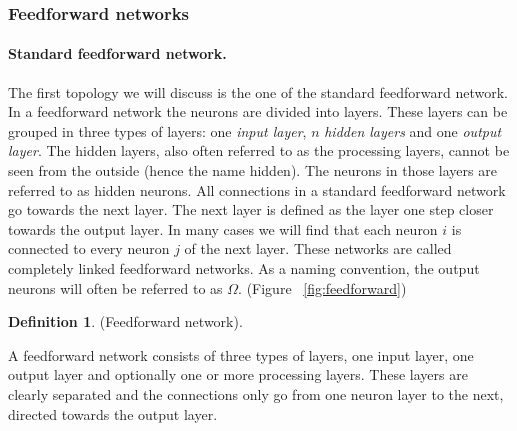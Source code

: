 \documentclass[pdftex,a4paper,12pt,twoside]{report}
\theoremstyle{plain} \newtheorem{theorem}{Theorem} \newtheorem{proposition}{Proposition} \newtheorem{lemma}{Lemma} \newtheorem*{corollary}{Corollary}
\theoremstyle{definition} \newtheorem{definition}{Definition} \newtheorem{conjecture}{Conjecture} \newtheorem*{example}{Example} \newtheorem{algorithm}{Algorithm}
\theoremstyle{remark} \newtheorem*{remark}{Remark} \newtheorem*{note}{Note} \newtheorem{case}{Case}
\begin{document}
\subsubsection{Feedforward networks}
\paragraph{Standard feedforward network.\label{par:feedforward}} The first topology we will discuss is the one of the standard feedforward network. In a feedforward network the neurons are divided into layers. These layers can be grouped in three types of layers: one \emph{input layer}, $n$ \emph{hidden layers} and one \emph{output layer}. The hidden layers, also often referred to as the processing layers, cannot be seen from the outside (hence the name hidden). The neurons in those layers are referred to as hidden neurons. All connections in a standard feedforward network go towards the next layer. The next layer is defined as the layer one step closer towards the output layer. In many cases we will find that each neuron $i$ is connected to every neuron $j$ of the next layer. These networks are called completely linked feedforward networks. As a naming convention, the output neurons will often be referred to as $\Omega$. (Figure ~\ref{fig:feedforward})
\begin{definition}
(Feedforward network). 
\end{definition} A feedforward network consists of three types of layers, one input layer, one output layer and optionally one or more processing layers. These layers are clearly separated and the connections only go from one neuron layer to the next, directed towards the output layer.
\end{document}
